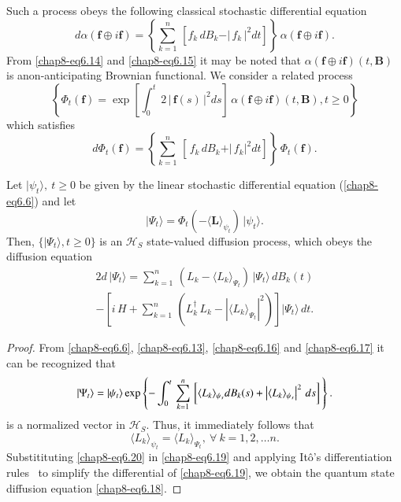 Such a process obeys the following classical stochastic differential equation   
\begin{equation}
d\alpha(\mathbf{f}\oplus i\mathbf{f})=  \left\{\sum_{k=1}^{n}\,\left[ f_k\, dB_k-\vert\, f_k\,\vert^2 dt\right]\right\}\, \alpha(\mathbf{f}\oplus i\mathbf{f}).\label{chap8-eq6.15}
\end{equation}
From \eqref{chap8-eq6.14} and \eqref{chap8-eq6.15} it may be noted that $\alpha(\mathbf{f}\oplus i\mathbf{f})(t,\mathbf{B})$ is a\break  non-anticipating Brownian functional. We consider a related process 
$$\left\{\Phi_t(\mathbf{f}) = {\exp}\left[\int_0^t\, 2\,\vert\,\mathbf{f}(s)\,\vert^2 ds\right]\, \alpha(\mathbf{f}\oplus i \mathbf{f})(t,\mathbf{B}), t\geq 0\right\}$$ 
which satisfies 
\begin{equation}
d\Phi_t(\mathbf{f})= \left\{\sum_{k=1}^n\, \left[\, f_k\, dB_k+\vert\,f_k\vert^2 dt\right]\right\}\, \Phi_t(\mathbf{f}). \label{chap8-eq6.16}
\end{equation}

\begin{thm}\label{chap8-thm2}
Let $\vert\psi_t\rangle,\ t\geq 0$ be given by the linear stochastic differential equation (\ref{chap8-eq6.6}) and let  
\begin{equation}
\vert \Psi_t\rangle=\Phi_t(-\langle\mathbf{L}\rangle_{\psi_t})\, \vert\psi_t\rangle. \label{chap8-eq6.17}
\end{equation}
Then, $\{\vert \Psi_t\rangle, t\geq 0\}$ is an $\mathcal{H}_S$ state-valued diffusion process, which obeys the diffusion equation  
\begin{multline}{2}
d\,\vert\Psi_t\rangle = \sum_{k=1}^n\, (L_k-\langle L_k\rangle_{\Psi_t})\, \vert\Psi_t\rangle\, dB_k(t) \\
- \left[i\, H + \sum_{k=1}^n\, \left(L_k^\dag\, L_k-\left|\langle L_k\rangle_{\Psi_t} \right|^2 \right) \right] \vert\Psi_t\rangle\, dt. \label{chap8-eq6.18}
\end{multline}
\end{thm}

\begin{proof}
From \eqref{chap8-eq6.6}, \eqref{chap8-eq6.13}, \eqref{chap8-eq6.16} and \eqref{chap8-eq6.17} it can be recognized that   
\begin{equation}
\vert\Psi_t\rangle=\vert \psi_t\rangle\, {\rm exp}\left\{-\int_{0}^t\, \sum_{k=1}^n\, 
\left[\langle  L_k\rangle_{\psi_s} d B_k(s)+ \left|\langle  L_k\rangle_{\psi_s}\right|^2\, ds\right]\, \right\}. \label{chap8-eq6.19}
\end{equation} 
is a normalized vector in $\mathcal{H}_S$. Thus, it immediately follows that      
\begin{equation}
\langle L_k\rangle_{\psi_t}=\langle L_k\rangle_{\Psi_t},\ \forall\ k=1,2,\ldots n.\label{chap8-eq6.20}
\end{equation}
Substitituting \eqref{chap8-eq6.20} in \eqref{chap8-eq6.19}
and applying It{\^o}'s differentiation rules~\cite{chap8-key38} to simplify the differential of \eqref{chap8-eq6.19}, we obtain the quantum state diffusion equation \eqref{chap8-eq6.18}. 
\end{proof}

